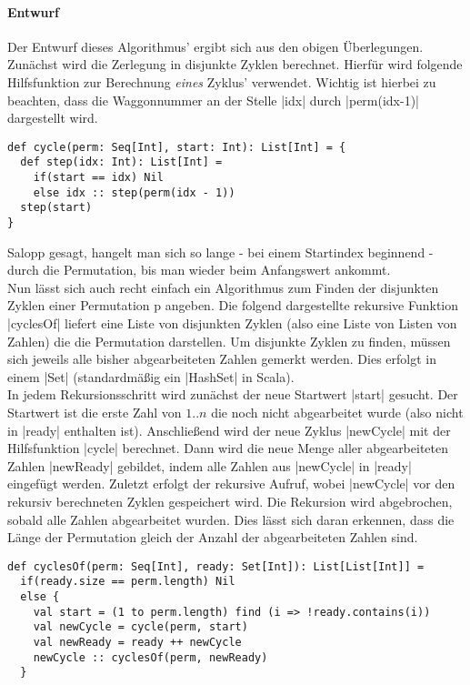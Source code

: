 \paragraph{Entwurf}
\label{slow_cycler}
Der Entwurf dieses Algorithmus' ergibt sich aus den obigen Überlegungen. Zunächst wird die Zerlegung in disjunkte Zyklen berechnet.
Hierfür wird folgende Hilfsfunktion zur Berechnung \emph{eines} Zyklus' verwendet.
Wichtig ist hierbei zu beachten, dass die Waggonnummer an der Stelle |idx| durch |perm(idx-1)| dargestellt wird.
\lstset{language=Scala}
\lstset{basicstyle=\small}
\begin{lstlisting}
def cycle(perm: Seq[Int], start: Int): List[Int] = {
  def step(idx: Int): List[Int] =
    if(start == idx) Nil
    else idx :: step(perm(idx - 1))
  step(start)
}
\end{lstlisting}
Salopp gesagt, hangelt man sich so lange - bei einem Startindex beginnend - durch die Permutation, bis man wieder beim Anfangswert ankommt.\\
Nun lässt sich auch recht einfach ein Algorithmus zum Finden der disjunkten Zyklen einer Permutation p angeben.
Die folgend dargestellte rekursive Funktion |cyclesOf| liefert eine Liste von disjunkten Zyklen (also eine Liste von Listen von Zahlen)
die die Permutation darstellen. Um disjunkte Zyklen zu finden, müssen sich jeweils alle bisher abgearbeiteten Zahlen gemerkt werden.
Dies erfolgt in einem |Set| (standardmäßig ein |HashSet| in Scala). \\
In jedem Rekursionsschritt wird zunächst der neue Startwert |start| gesucht.
Der Startwert ist die erste Zahl von $1..n$ die noch nicht abgearbeitet wurde (also nicht in |ready| enthalten ist).
Anschließend wird der neue Zyklus |newCycle| mit der Hilfsfunktion |cycle| berechnet.
Dann wird die neue Menge aller abgearbeiteten Zahlen |newReady| gebildet, indem alle Zahlen aus |newCycle| in |ready| eingefügt werden.
Zuletzt erfolgt der rekursive Aufruf, wobei |newCycle| vor den rekursiv berechneten Zyklen gespeichert wird.
Die Rekursion wird abgebrochen, sobald alle Zahlen abgearbeitet wurden. Dies lässt sich daran erkennen,
dass die Länge der Permutation gleich der Anzahl der abgearbeiteten Zahlen sind. \\
\lstset{language=Scala}
\lstset{basicstyle=\small}
\begin{lstlisting}
def cyclesOf(perm: Seq[Int], ready: Set[Int]): List[List[Int]] =
  if(ready.size == perm.length) Nil
  else {
    val start = (1 to perm.length) find (i => !ready.contains(i))
    val newCycle = cycle(perm, start)
    val newReady = ready ++ newCycle
    newCycle :: cyclesOf(perm, newReady)
  }
\end{lstlisting}

